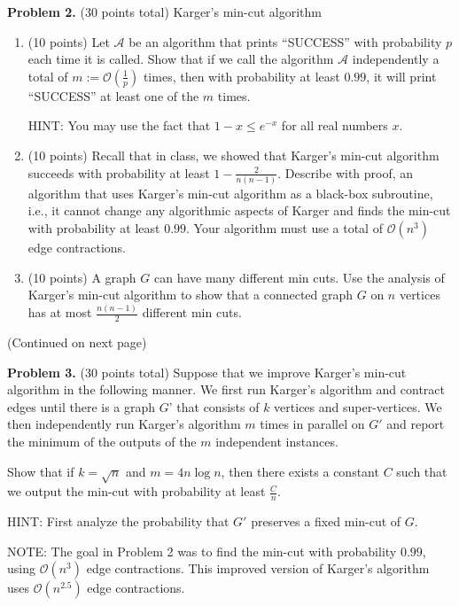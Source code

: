 \documentclass[11pt]{article}
\begin{document}
\vskip 0.2in\noindent
\textbf{Problem 2.} (30 points total)
Karger's min-cut algorithm
\begin{enumerate}
\item (10 points)
Let $\mathcal{A}$ be an algorithm that prints ``SUCCESS'' with probability $p$ each time it is called. 
Show that if we call the algorithm $\mathcal{A}$ independently a total of $m:=\mathcal{O}\left(\frac{1}{p}\right)$ times, then with probability at least $0.99$, it will print ``SUCCESS'' at least one of the $m$ times. 

\noindent
HINT: You may use the fact that $1-x\le e^{-x}$ for all real numbers $x$. 
\item (10 points)
Recall that in class, we showed that Karger's min-cut algorithm succeeds with probability at least $1-\frac{2}{n(n-1)}$. 
Describe with proof, an algorithm that uses Karger's min-cut algorithm as a black-box subroutine, i.e., it cannot change any algorithmic aspects of Karger and finds the min-cut with probability at least $0.99$. 
Your algorithm must use a total of $\mathcal{O}(n^3)$ edge contractions. 
\item (10 points)
A graph $G$ can have many different min cuts. 
Use the analysis of Karger's min-cut algorithm to show that a connected graph $G$ on $n$ vertices has at most $\frac{n(n-1)}{2}$ different min cuts. 
\end{enumerate}
\vskip 0.5in\noindent
\begin{center}
(Continued on next page)
\end{center}
\newpage
\noindent
\textbf{Problem 3.} (30 points total)
Suppose that we improve Karger's min-cut algorithm in the following manner. 
We first run Karger's algorithm and contract edges until there is a graph $G$' that consists of $k$ vertices and super-vertices. 
We then independently run Karger's algorithm $m$ times in parallel on $G'$ and report the minimum of the outputs of the $m$ independent instances. 

\vskip 0.1in\noindent
Show that if $k=\sqrt{n}$ and $m=4n\log n$, then there exists a constant $C$ such that we output the min-cut with probability at least $\frac{C}{n}$. 

\vskip 0.1in\noindent
HINT: First analyze the probability that $G'$ preserves a fixed min-cut of $G$. 

\vskip 0.1in\noindent
NOTE: The goal in Problem 2 was to find the min-cut with probability $0.99$, using $\mathcal{O}(n^3)$ edge contractions. 
This improved version of Karger's algorithm uses $\mathcal{O}(n^{2.5})$ edge contractions. 
\end{document}

